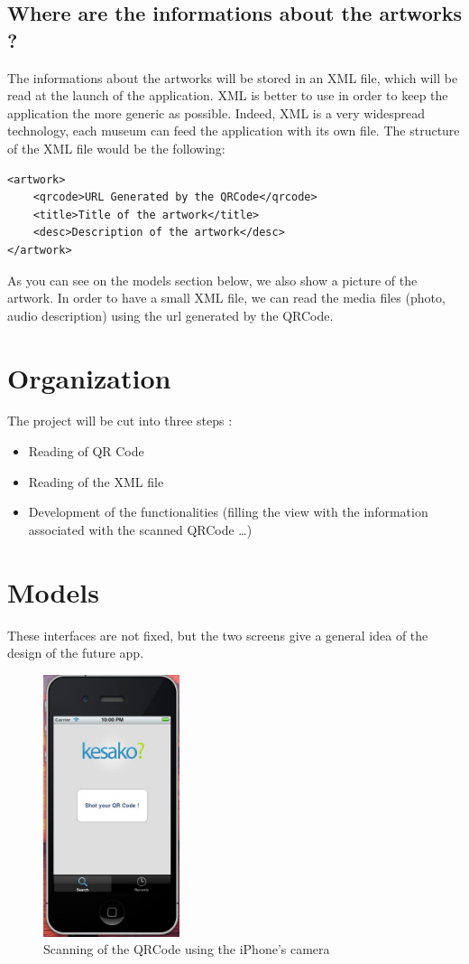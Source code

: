 \documentclass[a4paper, 12pt, final]{article}
\begin{document}
 \subsection{Where are the informations about the artworks ?}
The informations about the artworks will be stored in an XML file, which will be read at the launch of the application. XML is better to use in order to keep the application the more generic as possible. Indeed, XML is a very widespread technology, each museum can feed the application with its own file. The structure of the XML file would be the following: 
\begin{lstlisting}
<artwork>
	<qrcode>URL Generated by the QRCode</qrcode>
	<title>Title of the artwork</title>
	<desc>Description of the artwork</desc>
</artwork> 
\end{lstlisting} 
As you can see on the models section below, we also show a picture of the artwork. In order to have a small XML file, we can read the media files (photo, audio description) using the url generated by the QRCode. 

\section{Organization}
The project will be cut into three steps :
\begin{itemize}
\item Reading of QR Code
\item Reading of the XML file
\item Development of the functionalities (filling the view with the information associated with the scanned QRCode …)
\end{itemize}

\section{Models} 
These interfaces are not fixed, but the two screens give a general idea of the design of the future app.\\ 
\begin{figure}[!h] %
\centering
\includegraphics[width=4cm]{1.jpg} %
\caption{Scanning of the QRCode using the iPhone's camera} %
\label{api} %
\end{figure} %
 
\end{document}
